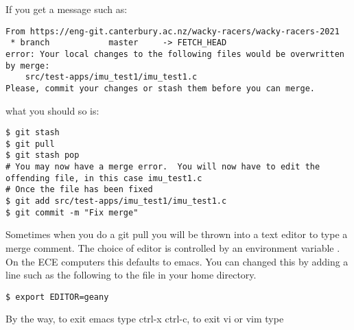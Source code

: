 If you get a message such as:

\begin{verbatim}
From https://eng-git.canterbury.ac.nz/wacky-racers/wacky-racers-2021
 * branch            master     -> FETCH_HEAD
error: Your local changes to the following files would be overwritten by merge:
    src/test-apps/imu_test1/imu_test1.c
Please, commit your changes or stash them before you can merge.
\end{verbatim}

what you should so is:

\begin{verbatim}
$ git stash
$ git pull
$ git stash pop
# You may now have a merge error.  You will now have to edit the offending file, in this case imu_test1.c
# Once the file has been fixed
$ git add src/test-apps/imu_test1/imu_test1.c
$ git commit -m "Fix merge"
\end{verbatim}

Sometimes when you do a git pull you will be thrown into a text editor
to type a merge comment. The choice of editor is controlled by an
environment variable . On the ECE computers this defaults
to emacs. You can changed this by adding a line such as the following to
the  file in your home directory.

\begin{verbatim}
$ export EDITOR=geany
\end{verbatim}

By the way, to exit emacs type ctrl-x ctrl-c, to exit vi or vim type 

